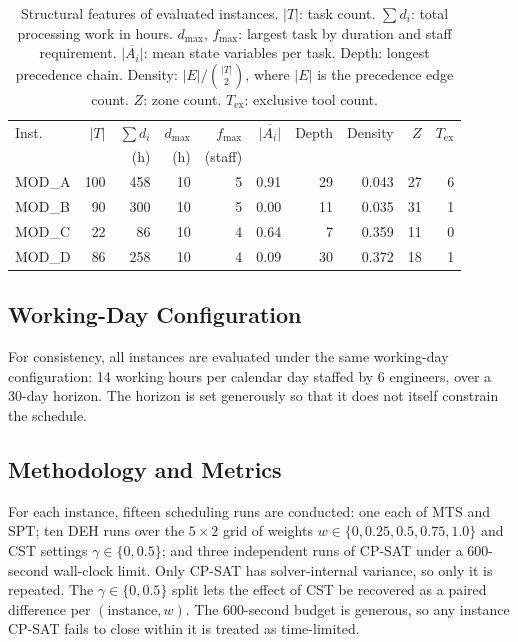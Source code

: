 \documentclass[conference]{IEEEtran}
\begin{document}
\begin{table}[ht]
\caption{Structural features of evaluated instances.
$|T|$: task count. $\sum d_i$: total processing work in hours.
$d_{\max}$, $f_{\max}$: largest task by duration and staff requirement.
$\overline{|A_i|}$: mean state variables per task. Depth: longest precedence
chain. Density: $|E|/\binom{|T|}{2}$, where $|E|$ is the precedence
edge count.
$Z$: zone count. $T_{\text{ex}}$: exclusive tool count.}
\label{tab:instances}
\centering
\renewcommand{\arraystretch}{1.15}
\setlength{\tabcolsep}{4pt}
\begin{tabular}{@{}lrrrrrrrrr@{}}
\toprule
Inst.\ & $|T|$ & $\sum d_i$ & $d_{\max}$ & $f_{\max}$ & $\overline{|A_i|}$ & Depth & Density & $Z$ & $T_{\text{ex}}$ \\
       &       & (h)        & (h)        & (staff)    &                    &       &         &     &                 \\
\midrule
MOD\_A & 100 & 458 & 10 & 5 & 0.91 & 29 & 0.043 & 27 & 6 \\
MOD\_B &  90 & 300 & 10 & 5 & 0.00 & 11 & 0.035 & 31 & 1 \\
MOD\_C &  22 &  86 & 10 & 4 & 0.64 &  7 & 0.359 & 11 & 0 \\
MOD\_D &  86 & 258 & 10 & 4 & 0.09 & 30 & 0.372 & 18 & 1 \\
\bottomrule
\end{tabular}
\end{table}

\subsection{Working-Day Configuration}
\label{sec:shiftconfig}

For consistency, all instances are evaluated under the same
working-day configuration: 14 working hours per calendar day staffed
by 6 engineers, over a 30-day horizon. The horizon is set generously
so that it does not itself constrain the schedule.

\subsection{Methodology and Metrics}
\label{sec:methodology}

For each instance, fifteen scheduling runs are conducted: one each
of MTS and SPT; ten DEH runs over the $5 \times 2$ grid of weights
$w \in \{0, 0.25, 0.5, 0.75, 1.0\}$ and CST settings
$\gamma \in \{0, 0.5\}$; and three independent runs of CP-SAT under
a 600-second wall-clock limit. Only CP-SAT has solver-internal
variance, so only it is repeated. The $\gamma \in \{0, 0.5\}$ split
lets the effect of CST be recovered as a paired difference per
$(\text{instance}, w)$. The 600-second budget is generous, so any
instance CP-SAT fails to close within it is treated as time-limited.
\end{document}
